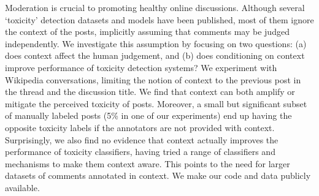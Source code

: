 Moderation is crucial to promoting healthy online discussions. Although several ‘toxicity' detection datasets and models have been published, most of them ignore the context of the posts, implicitly assuming that comments may be judged independently. We investigate this assumption by focusing on two questions: (a) does context affect the human judgement, and (b) does conditioning on context improve performance of toxicity detection systems? We experiment with Wikipedia conversations, limiting the notion of context to the previous post in the thread and the discussion title. We find that context can both amplify or mitigate the perceived toxicity of posts. Moreover, a small but significant subset of manually labeled posts (5\% in one of our experiments) end up having the opposite toxicity labels if the annotators are not provided with context. Surprisingly, we also find no evidence that context actually improves the performance of toxicity classifiers, having tried a range of classifiers and mechanisms to make them context aware. This points to the need for larger datasets of comments annotated in context. We make our code and data publicly available.
